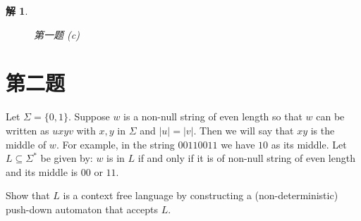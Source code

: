 \documentclass[12pt,onecolumn]{article}
\theoremstyle{plain}
\newtheorem{solution}{解}[section]
\begin{document}
\begin{solution}
\begin{figure}[H]
 \caption{第一题 (c)}
 \end{figure}
\end{solution}

\section{第二题}
Let $\Sigma = \{0, 1\}$.
Suppose $w$ is a non-null string of even length so that
$w$ can be written as $uxyv$ with $x, y$ in $\Sigma$ and $|u| = |v|$.
Then we will say that $xy$ is the middle of $w$.
For example, in the string $00110011$ we have $10$ as its middle.
Let $L \subseteq \Sigma^*$ be given by:
$w$ is in $L$ if and only if
it is of non-null string of even length and its middle is $00$ or $11$.

Show that $L$ is a context free language by
constructing a (non-deterministic) push-down automaton that accepts $L$.
\end{document}
